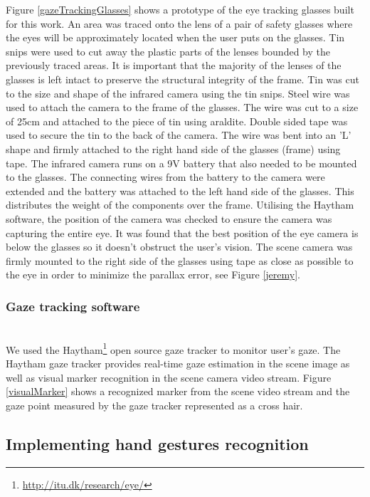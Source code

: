 \documentclass[jou,a4paper,notxfonts]{apa}
\begin{document}
Figure \ref{gazeTrackingGlasses} shows a prototype of the eye tracking glasses built for this work. An area was traced onto the lens of a pair of safety glasses where the eyes will be approximately located when the user puts on the glasses. Tin snips were used to cut away the plastic parts of the lenses bounded by the previously traced areas. It is important that the majority of the lenses of the glasses is left intact to preserve the structural integrity of the frame. Tin was cut to the size and shape of the infrared camera using the tin snips. Steel wire was used to attach the camera to the frame of the glasses. The wire was cut to a size of 25cm and attached to the piece of tin using araldite. Double sided tape was used to secure the tin to the back of the camera. The wire was bent into an 'L' shape and firmly attached to the right hand side of the glasses (frame) using tape. The infrared camera runs on a 9V battery that also needed to be mounted to the glasses. The connecting wires from the battery to the camera were extended and the battery was attached to the left hand side of the glasses. This distributes the weight of the components over the frame. Utilising the Haytham software, the position of the camera was checked to ensure the camera was capturing the entire eye. It was found that the best position of the eye camera is below the glasses so it doesn't obstruct the user's vision. The scene camera was firmly mounted to the right side of the glasses using tape as close as possible to the eye in order to minimize the parallax error, see Figure \ref{jeremy}.

\subsubsection{Gaze tracking software}\hspace{0pt} \\
We used the Haytham\footnote{\url{http://itu.dk/research/eye/}} open source gaze tracker to monitor user's gaze. The Haytham gaze tracker provides real-time gaze estimation in the scene image as well as visual marker recognition in the scene camera video stream. Figure \ref{visualMarker} shows a recognized marker from the scene video stream and the gaze point measured by the gaze tracker represented as a cross hair. 

\subsection{Implementing hand gestures recognition}
\end{document}
